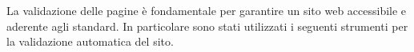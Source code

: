 La validazione delle pagine è fondamentale per garantire un sito web accessibile e aderente agli standard.
In particolare sono stati utilizzati i seguenti strumenti per la validazione automatica del sito.